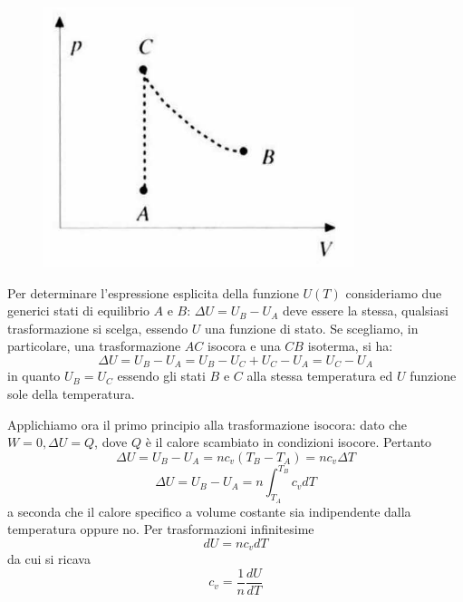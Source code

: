 \documentclass[class=book, crop=false, oneside, 12pt]{standalone}
\begin{document}
\begin{figure}[h]
    \includegraphics[scale=0.4]{ACB.png}
    \centering
    \caption{}
\end{figure}

Per determinare l'espressione esplicita della funzione \(U(T)\) consideriamo due generici stati di equilibrio \(A\) e \(B\): \(\Delta U = U_B - U_A\) deve essere la stessa, qualsiasi trasformazione si scelga, essendo \(U\) una funzione di stato.
Se scegliamo, in particolare, una trasformazione \(A C\) isocora e una \(C B\) isoterma, si ha:
\begin{equation*}
    \Delta U = U_B - U_A = U_B - U_C + U_C - U_A = U_C - U_A
\end{equation*}
in quanto \(U_B = U_C\) essendo gli stati \(B\) e \(C\) alla stessa temperatura ed \(U\) funzione sole della temperatura.

Applichiamo ora il primo principio alla trasformazione isocora: dato che \(W = 0, \Delta U = Q\), dove \(Q\) è il calore scambiato in condizioni isocore. 
Pertanto 
\begin{equation}
    \Delta U = U_B - U_A = n c_v (T_B - T_A) = n c_v \Delta T 
\end{equation}
\begin{equation}
    \Delta U = U_B - U_A = n \int_{T_A}^{T_B} c_v d T
\end{equation}
a seconda che il calore specifico a volume costante sia indipendente dalla temperatura oppure no. 
Per trasformazioni infinitesime
\begin{equation}
    d U = n c_v d T
\end{equation}
da cui si ricava
\begin{equation}
    c_v = \frac{1}{n} \frac{d U}{d T}
\end{equation}
\end{document}
